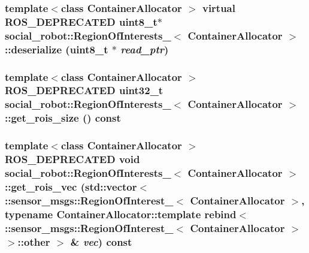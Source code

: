 \label{structsocial__robot_1_1RegionOfInterests___a9d788090d90f2322c9b7654e319bfe40}
\hypertarget{structsocial__robot_1_1RegionOfInterests___af093b8c6c0c454673009553040c564db}{
\subsubsection[{deserialize}]{\setlength{\rightskip}{0pt plus 5cm}template$<$class ContainerAllocator $>$ virtual ROS\_\-DEPRECATED uint8\_\-t$\ast$ {\bf social\_\-robot::RegionOfInterests\_\-}$<$ ContainerAllocator $>$::deserialize (uint8\_\-t $\ast$ {\em read\_\-ptr})}}
\label{structsocial__robot_1_1RegionOfInterests___af093b8c6c0c454673009553040c564db}
\hypertarget{structsocial__robot_1_1RegionOfInterests___a6740bb05496add8b97e3bf94bff4b9af}{
\subsubsection[{get\_\-rois\_\-size}]{\setlength{\rightskip}{0pt plus 5cm}template$<$class ContainerAllocator $>$ ROS\_\-DEPRECATED uint32\_\-t {\bf social\_\-robot::RegionOfInterests\_\-}$<$ ContainerAllocator $>$::get\_\-rois\_\-size () const}}
\label{structsocial__robot_1_1RegionOfInterests___a6740bb05496add8b97e3bf94bff4b9af}
\hypertarget{structsocial__robot_1_1RegionOfInterests___ae0221ee438ffcc558e4629b51230b6c2}{
\subsubsection[{get\_\-rois\_\-vec}]{\setlength{\rightskip}{0pt plus 5cm}template$<$class ContainerAllocator $>$ ROS\_\-DEPRECATED void {\bf social\_\-robot::RegionOfInterests\_\-}$<$ ContainerAllocator $>$::get\_\-rois\_\-vec (std::vector$<$ ::sensor\_\-msgs::RegionOfInterest\_\-$<$ ContainerAllocator $>$, typename ContainerAllocator::template rebind$<$ ::sensor\_\-msgs::RegionOfInterest\_\-$<$ ContainerAllocator $>$ $>$::other $>$ \& {\em vec}) const}}
